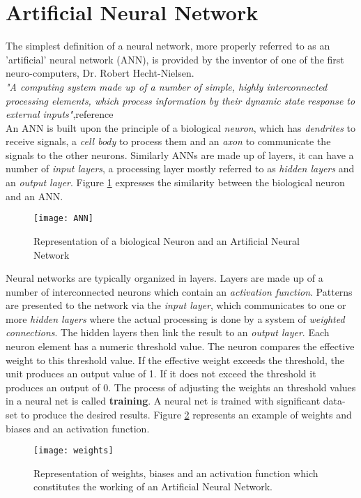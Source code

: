 \section{Artificial Neural Network}
The simplest definition of a neural network, more properly referred to as an 'artificial' neural network (ANN), is provided by the inventor of one of the first neuro-computers, Dr. Robert Hecht-Nielsen.\\
\textit{"A computing system made up of a number of simple, highly interconnected processing elements, which process information by their dynamic state response to external inputs"},reference \citet{caudill1987neural}\\
An ANN is built upon the principle of a biological \textit{neuron}, which has \textit{dendrites} to receive signals, a \textit{cell body} to process them and an \textit{axon} to communicate the signals to the other neurons. Similarly ANNs are made up of layers, it can have a number of \textit{input layers}, a processing layer mostly referred to as \textit{hidden layers} and an \textit{output layer}. Figure \ref{fig:2.10} expresses the similarity between the biological neuron and an ANN.\\
\begin{figure}[h]
 \centering
 \texttt{[image: ANN]}
 \caption{Representation of a biological Neuron and an Artificial Neural Network}
 \label{fig:2.10}
\end{figure}
Neural networks are typically organized in layers. Layers are made up of a number of interconnected neurons which contain an \textit{activation function}. Patterns are presented to the network via the \textit{input layer}, which communicates to one or more \textit{hidden layers} where the actual processing is done by a system of \textit{weighted connections}. The hidden layers then link the result to an \textit{output layer}. Each neuron element has a numeric threshold value. The neuron compares the effective weight to this threshold value. If the effective weight exceeds the threshold, the unit produces an output value of 1. If it does not exceed the threshold it produces an output of 0. The process of adjusting the weights an threshold values in a neural net is called \textbf{training}. A neural net is trained with significant data-set to produce the desired results. Figure \ref{fig:2.11} represents an example of weights and biases and an activation function.\\
\begin{figure}[h]
 \centering
 \texttt{[image: weights]}
 \caption{Representation of weights, biases and an activation function which constitutes the working of an Artificial Neural Network.}
 \label{fig:2.11}
\end{figure}
